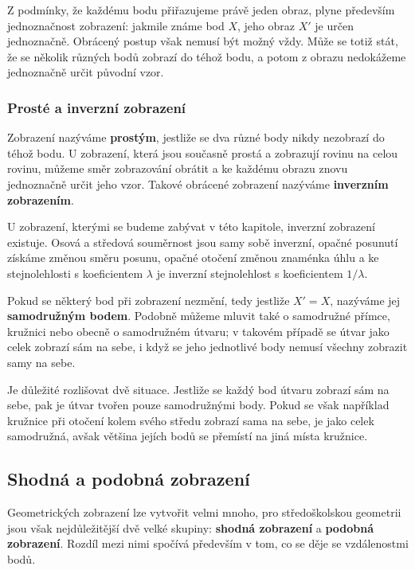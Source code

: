 \documentclass[12pt,a4paper]{article}
\begin{document}
Z podmínky, že každému bodu přiřazujeme právě jeden obraz, plyne především jednoznačnost zobrazení: jakmile známe bod $X$, jeho obraz $X'$ je určen jednoznačně. Obrácený postup však nemusí být možný vždy. Může se totiž stát, že se několik různých bodů zobrazí do téhož bodu, a potom z obrazu nedokážeme jednoznačně určit původní vzor.

\subsubsection*{Prosté a inverzní zobrazení}

Zobrazení nazýváme \textbf{prostým}, jestliže se dva různé body nikdy nezobrazí do téhož bodu. U zobrazení, která jsou současně prostá a zobrazují rovinu na celou rovinu, můžeme směr zobrazování obrátit a ke každému obrazu znovu jednoznačně určit jeho vzor. Takové obrácené zobrazení nazýváme \textbf{inverzním zobrazením}.

\begin{notebox}
    U zobrazení, kterými se budeme zabývat v této kapitole, inverzní zobrazení existuje. Osová a středová souměrnost jsou samy sobě inverzní, opačné posunutí získáme změnou směru posunu, opačné otočení změnou znaménka úhlu a ke stejnolehlosti s koeficientem $\lambda$ je inverzní stejnolehlost s koeficientem $1/\lambda$.
\end{notebox}

Pokud se některý bod při zobrazení nezmění, tedy jestliže $X'=X$, nazýváme jej \textbf{samodružným bodem}. Podobně můžeme mluvit také o samodružné přímce, kružnici nebo obecně o samodružném útvaru; v takovém případě se útvar jako celek zobrazí sám na sebe, i když se jeho jednotlivé body nemusí všechny zobrazit samy na sebe.

\begin{notebox}
    Je důležité rozlišovat dvě situace. Jestliže se každý bod útvaru zobrazí sám na sebe, pak je útvar tvořen pouze samodružnými body. Pokud se však například kružnice při otočení kolem svého středu zobrazí sama na sebe, je jako celek samodružná, avšak většina jejích bodů se přemístí na jiná místa kružnice.
\end{notebox}

\subsection{Shodná a podobná zobrazení}

Geometrických zobrazení lze vytvořit velmi mnoho, pro středoškolskou geometrii jsou však nejdůležitější dvě velké skupiny: \textbf{shodná zobrazení} a \textbf{podobná zobrazení}. Rozdíl mezi nimi spočívá především v tom, co se děje se vzdálenostmi bodů.
\end{document}
